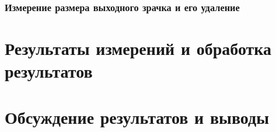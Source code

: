 \documentclass[a4paper, 12pt]{article}
\begin{document}
\subsubsection*{Измерение размера выходного зрачка и его удаление}





\section{Результаты измерений и обработка результатов}







\section{Обсуждение результатов и выводы}
\end{document}
